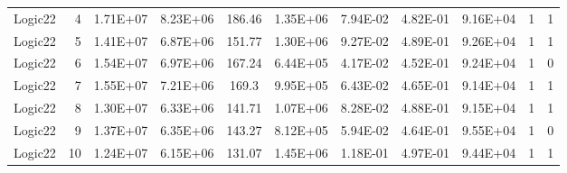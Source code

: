 \begin{longtable}{@{}l!{\vrule}r!{\vrule}c!{\vrule}c!{\vrule}c!{\vrule}c!{\vrule}c!{\vrule}c!{\vrule}c!{\vrule}c!{\vrule}c@{}}
Logic22 & 4 & 1.71E+07 & 8.23E+06 & 186.46 & 1.35E+06 & 7.94E-02 & 4.82E-01 & 9.16E+04 & 1 & 1 \\
Logic22 & 5 & 1.41E+07 & 6.87E+06 & 151.77 & 1.30E+06 & 9.27E-02 & 4.89E-01 & 9.26E+04 & 1 & 1 \\
Logic22 & 6 & 1.54E+07 & 6.97E+06 & 167.24 & 6.44E+05 & 4.17E-02 & 4.52E-01 & 9.24E+04 & 1 & 0 \\
Logic22 & 7 & 1.55E+07 & 7.21E+06 & 169.3 & 9.95E+05 & 6.43E-02 & 4.65E-01 & 9.14E+04 & 1 & 1 \\
Logic22 & 8 & 1.30E+07 & 6.33E+06 & 141.71 & 1.07E+06 & 8.28E-02 & 4.88E-01 & 9.15E+04 & 1 & 1 \\
Logic22 & 9 & 1.37E+07 & 6.35E+06 & 143.27 & 8.12E+05 & 5.94E-02 & 4.64E-01 & 9.55E+04 & 1 & 0 \\
Logic22 & 10 & 1.24E+07 & 6.15E+06 & 131.07 & 1.45E+06 & 1.18E-01 & 4.97E-01 & 9.44E+04 & 1 & 1 \\
\end{longtable}
\endgroup

\clearpage
